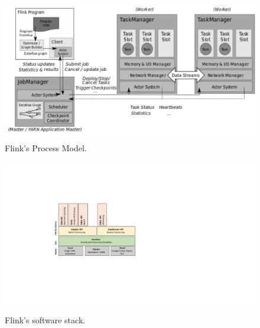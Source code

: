 \begin{figure}
\centering
	\includegraphics[width=.75\textwidth]{figs/process_model_updated}
\caption{Flink's Process Model.}
\end{figure}

\begin{figure}[ht]
\centering     %
\label{fig:FlinkStack}
\includegraphics[width=.5\textwidth]{figs/stack.pdf}

			
\caption{Flink's software stack.}
\end{figure}
